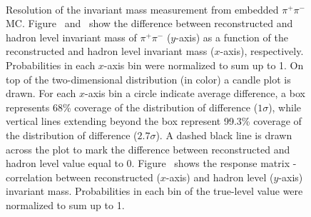 \begin{figure}[h]
{  \centering
  \begin{subfigure}[b]{\linewidth}\addtocounter{subfigure}{-2}\vspace*{-12pt}
  \end{subfigure}\\
    \begin{minipage}[t][1.042\linewidth][t]{\linewidth}\vspace{10pt}
    \caption[Resolution of the invariant mass measurement from embedded $\pi^{+}\pi^{-}$ MC.]{Resolution of the invariant mass measurement from embedded $\pi^{+}\pi^{-}$ MC. Figure~ and~ show the difference between reconstructed and hadron level invariant mass of $\pi^{+}\pi^{-}$ ($y$-axis) as a function of the reconstructed and hadron level invariant mass ($x$-axis), respectively. Probabilities in each $x$-axis bin were normalized to sum up to 1. On top of the two-dimensional distribution (in color) a candle plot is drawn. For each $x$-axis bin a circle indicate average difference, a box represents 68\% coverage of the distribution of difference ($1\sigma$), while vertical lines extending beyond the box represent 99.3\% coverage of the distribution of difference ($2.7\sigma$). A dashed black line is drawn across the plot to mark the difference between reconstructed and hadron level value equal to 0. Figure~ shows the response matrix - correlation between reconstructed ($x$-axis) and hadron level ($y$-axis) invariant mass. Probabilities in each bin of the true-level value were normalized to sum up to 1.}\label{fig:Response_InvMass}%
  \end{minipage}
}%
\end{figure}


